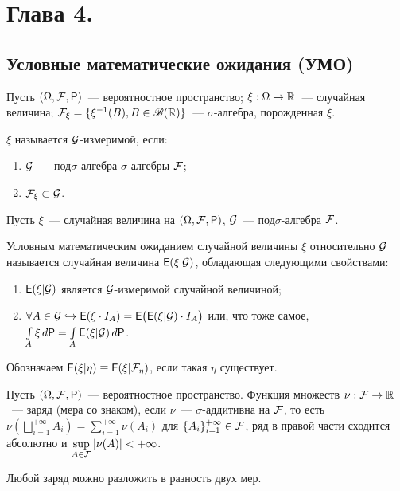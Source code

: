 \section{Глава 4.}
\subsection{Условные математические ожидания (УМО)}
Пусть $(\Omega, \mathcal{F}, \mathsf{P})$~--- вероятностное пространство; $\xi: \Omega \rightarrow \mathbb{R}$~--- случайная величина; $\mathcal{F}_\xi = \{ \xi^{-1}(B), B \in \mathscr{B}(\mathbb{R}) \}$~--- $\sigma$-алгебра, порожденная $\xi$. 

\begin{definition}
    $\xi$ называется $\mathcal{G}$-измеримой, если:
    \begin{enumerate}
        \item $\mathcal{G}$~--- под$\sigma$-алгебра $\sigma$-алгебры $\mathcal{F}$;
        \item $\mathcal{F}_\xi \subset \mathcal{G}$.
    \end{enumerate}
\end{definition}

\begin{definition}
	Пусть $\xi$~--- случайная величина на $(\Omega, \mathcal{F}, \mathsf{P})$, $\mathcal{G}$~--- под$\sigma$-алгебра $\mathcal{F}$. 
	
	Условным математическим ожиданием случайной величины $\xi$ относительно $\mathcal{G}$ называется случайная величина $\mathsf{E} (\xi | \mathcal{G})$, обладающая следующими свойствами:
	\begin{enumerate}
		\item $\mathsf{E}(\xi | \mathcal{G} )$ является $\mathcal{G}$-измеримой случайной величиной;
		\item $\forall A \in \mathcal{G} \hookrightarrow \mathsf{E} ( \xi \cdot I_A) = \mathsf{E} \big( \mathsf{E} (\xi | \mathcal{G} )\cdot I_A \big)$ или, что тоже самое, $\int\limits_A \xi \, d \mathsf{P} = \int\limits_A \mathsf{E} (\xi | \mathcal{G} )\,d \mathsf{P}$.
	\end{enumerate}
	Обозначаем $\mathsf{E} (\xi | \eta ) \equiv \mathsf{E} (\xi | \mathcal{F}_\eta )$, если такая $\eta$ существует.
\end{definition}
\begin{definition}
	Пусть $(\Omega, \mathcal{F}, \mathsf{P})$~--- вероятностное пространство. Функция множеств $\nu: \mathcal{F} \rightarrow \mathbb{R}$~--- заряд (мера со знаком), если $\nu$~--- $\sigma$-аддитивна на $\mathcal{F}$, то есть $\nu \left( \bigsqcup\limits_{i=1}^{+\infty} A_i \right) = \sum\limits_{i=1}^{+\infty} \nu (A_i)$ для $\{ A_i \}_{i=1}^{+\infty} \in \mathcal{F}$, ряд в правой части сходится абсолютно и  $\sup\limits_{A \in \mathcal{F}} | \nu(A) | < + \infty$.
	
	Любой заряд можно разложить в разность двух мер.
\end{definition}

